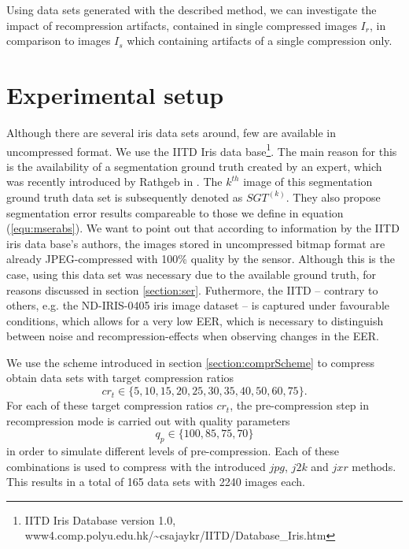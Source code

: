 \documentclass[10pt,twocolumn,letterpaper]{article}
\begin{document}
Using data sets generated with the described method, we can investigate the impact of recompression artifacts, contained in single compressed images $I_r$, in comparison to images $I_s$ which  containing artifacts of a single compression only.

\section{Experimental setup}
\label{section:exSetup}
Although there are several iris data sets around, few are available in uncompressed format. We use the IITD Iris data base\footnote{IITD Iris Database version 1.0, www4.comp.polyu.edu.hk/\textasciitilde csajaykr/IITD/Database\_Iris.htm}. The main reason for this is the availability of a segmentation ground truth created by an expert, which was recently introduced by Rathgeb \etal in \cite{severeCompression}. The $k^{th}$ image of this segmentation ground truth data set is subsequently denoted as $SGT^{(k)}$. They also propose segmentation error results compareable to those we define in equation (\ref{equ:mserabs}).
We want to point out that according to information by the IITD iris data base's authors, the images stored in uncompressed bitmap format are already JPEG-compressed with 100\% quality by the sensor. Although this is the case, using this data set was necessary due to the available ground truth, for reasons discussed in section \ref{section:ser}. Futhermore, the IITD -- contrary to others, e.g. the ND-IRIS-0405 iris image dataset \cite{Bowyer_thend-iris-0405}-- is captured under favourable conditions, which allows for a very low EER, which is necessary to distinguish between noise and recompression-effects when observing changes in the EER. 

We use the scheme introduced in section \ref{section:comprScheme} to compress obtain data sets with target compression ratios
\begin{equation}
cr_t \in \{5,10,15,20,25,30,35,40,50,60,75\}.
\end{equation}
For each of these target compression ratios $cr_t$, the pre-compression step in recompression mode is carried out with quality parameters
\begin{equation}
q_p \in \{100, 85, 75, 70\}
\end{equation} 
in order to simulate different levels of pre-compression. Each of these combinations is used to compress with the introduced $jpg$, $j2k$ and $jxr$ methods. This results in a total of 165 data sets with 2240 images each.
\end{document}
